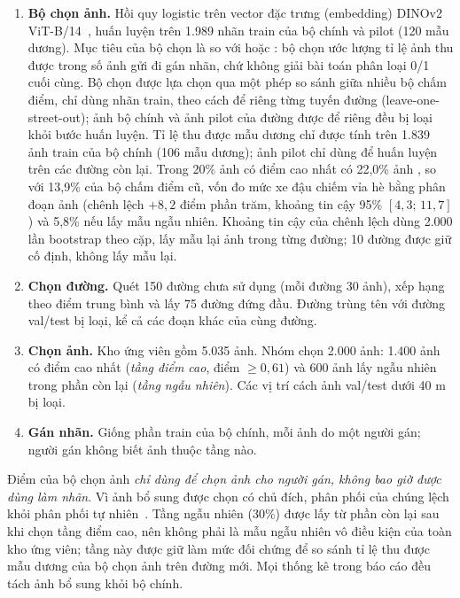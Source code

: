 \begin{enumerate}
  \item \textbf{Bộ chọn ảnh.} Hồi quy logistic trên vector đặc trưng (embedding) DINOv2 ViT-B/14~\cite{oquab2023dinov2}, huấn luyện trên 1.989 nhãn train của bộ chính và pilot (120 mẫu dương). Mục tiêu của bộ chọn là  so với  hoặc : bộ chọn ước lượng tỉ lệ ảnh  thu được trong số ảnh gửi đi gán nhãn, chứ không giải bài toán phân loại 0/1 cuối cùng. Bộ chọn được lựa chọn qua một phép so sánh giữa nhiều bộ chấm điểm, chỉ dùng nhãn train, theo cách để riêng từng tuyến đường (leave-one-street-out); ảnh bộ chính và ảnh pilot của đường được để riêng đều bị loại khỏi bước huấn luyện. Tỉ lệ thu được mẫu dương chỉ được tính trên 1.839 ảnh train của bộ chính (106 mẫu dương); ảnh pilot chỉ dùng để huấn luyện trên các đường còn lại. Trong 20\% ảnh có điểm cao nhất có 22,0\% ảnh , so với 13,9\% của bộ chấm điểm cũ, vốn đo mức xe đậu chiếm vỉa hè bằng phân đoạn ảnh (chênh lệch $+8{,}2$ điểm phần trăm, khoảng tin cậy 95\% $[4{,}3;\,11{,}7]$) và 5,8\% nếu lấy mẫu ngẫu nhiên. Khoảng tin cậy của chênh lệch dùng 2.000 lần bootstrap theo cặp, lấy mẫu lại ảnh trong từng đường; 10 đường được giữ cố định, không lấy mẫu lại.
  \item \textbf{Chọn đường.} Quét 150 đường chưa sử dụng (mỗi đường 30 ảnh), xếp hạng theo điểm trung bình và lấy 75 đường đứng đầu. Đường trùng tên với đường val/test bị loại, kể cả các đoạn khác của cùng đường.
  \item \textbf{Chọn ảnh.} Kho ứng viên gồm 5.035 ảnh. Nhóm chọn 2.000 ảnh: 1.400 ảnh có điểm cao nhất (\emph{tầng điểm cao}, điểm $\ge 0{,}61$) và 600 ảnh lấy ngẫu nhiên trong phần còn lại (\emph{tầng ngẫu nhiên}). Các vị trí cách ảnh val/test dưới 40 m bị loại.
  \item \textbf{Gán nhãn.} Giống phần train của bộ chính, mỗi ảnh do một người gán; người gán không biết ảnh thuộc tầng nào.
\end{enumerate}

Điểm của bộ chọn ảnh \emph{chỉ dùng để chọn ảnh cho người gán, không bao giờ được dùng làm nhãn}. Vì ảnh bổ sung được chọn có chủ đích, phân phối của chúng lệch khỏi phân phối tự nhiên~\cite{farquhar2021bias}. Tầng ngẫu nhiên (30\%) được lấy từ phần còn lại sau khi chọn tầng điểm cao, nên không phải là mẫu ngẫu nhiên vô điều kiện của toàn kho ứng viên; tầng này được giữ làm mức đối chứng để so sánh tỉ lệ thu được mẫu dương của bộ chọn ảnh trên đường mới. Mọi thống kê trong báo cáo đều tách ảnh bổ sung khỏi bộ chính.

